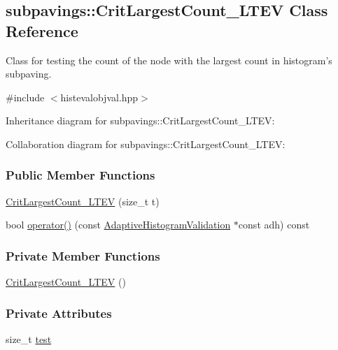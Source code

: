 \hypertarget{classsubpavings_1_1CritLargestCount__LTEV}{\subsection{subpavings\-:\-:\-Crit\-Largest\-Count\-\_\-\-L\-T\-E\-V \-Class \-Reference}
\label{classsubpavings_1_1CritLargestCount__LTEV}
}


\-Class for testing the count of the node with the largest count in histogram's subpaving.  




{\ttfamily \#include $<$histevalobjval.\-hpp$>$}



\-Inheritance diagram for subpavings\-:\-:\-Crit\-Largest\-Count\-\_\-\-L\-T\-E\-V\-:


\-Collaboration diagram for subpavings\-:\-:\-Crit\-Largest\-Count\-\_\-\-L\-T\-E\-V\-:
\subsubsection*{\-Public \-Member \-Functions}
\begin{DoxyCompactItemize}
\item 
\hyperlink{classsubpavings_1_1CritLargestCount__LTEV_aaa171b921a6dfe57f88ec2a8140eed9c}{\-Crit\-Largest\-Count\-\_\-\-L\-T\-E\-V} (size\-\_\-t t)
\item 
bool \hyperlink{classsubpavings_1_1CritLargestCount__LTEV_a91c526ecfba7c9463ac6a45df852f8dd}{operator()} (const \hyperlink{classsubpavings_1_1AdaptiveHistogramValidation}{\-Adaptive\-Histogram\-Validation} $\ast$const adh) const 
\end{DoxyCompactItemize}
\subsubsection*{\-Private \-Member \-Functions}
\begin{DoxyCompactItemize}
\item 
\hyperlink{classsubpavings_1_1CritLargestCount__LTEV_a223a25dec185b862eefc974e456d0dbb}{\-Crit\-Largest\-Count\-\_\-\-L\-T\-E\-V} ()
\end{DoxyCompactItemize}
\subsubsection*{\-Private \-Attributes}
\begin{DoxyCompactItemize}
\item 
size\-\_\-t \hyperlink{classsubpavings_1_1CritLargestCount__LTEV_a49fe3740ffe286d9295c935d8f1f902d}{test}
\end{DoxyCompactItemize}


